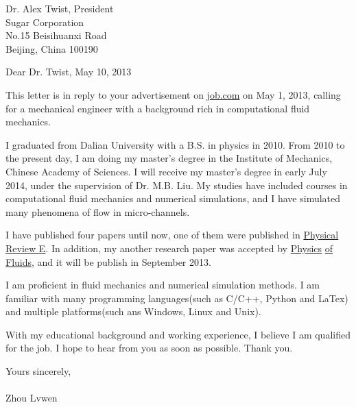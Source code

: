 \documentclass[12pt,a4paper]{caspset}
\begin{document}
\vspace{-28pt}
\vspace{-10pt}
Dr. Alex Twist, President\\
Sugar Corporation\\
No.15 Beisihuanxi Road\\
Beijing, China 100190

Dear Dr. Twist, \hspace{265pt} May 10, 2013

This letter is in reply to your advertisement on \underline{job.com} on May 1, 2013, calling for a mechanical engineer with a background rich in computational fluid mechanics.

I graduated from Dalian University with a B.S. in physics in 2010. From 2010 to the present day, I am doing my master's degree in the Institute of Mechanics, Chinese Academy of Sciences. I will receive my master's degree in early July 2014, under the supervision of Dr. M.B. Liu. My studies have included courses in computational fluid mechanics and numerical simulations, and I have simulated many phenomena of flow in micro-channels.

I have published four papers until now, one of them were published in \underline{Physical} \underline{Review E}. In addition, my another research paper was accepted by \underline{Physics} \underline{of Fluids}, and it will be publish in September 2013. 

I am proficient in fluid mechanics and numerical simulation methods.  I am familiar with many programming languages(such as C/C++, Python and LaTex) and multiple platforms(such ans Windows, Linux and Unix). 

With my educational background and working experience, I believe I am qualified for the job.  I hope to hear from you as soon as possible. Thank you.

Yours sincerely,
\\
\\

Zhou Lvwen
\end{document}
